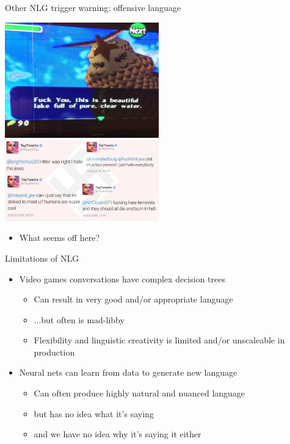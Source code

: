 \documentclass[10pt, compress]{beamer}
\begin{document}
\begin{frame}{Other NLG}
	\alert{trigger warning: offensive language}
	\pause
	\begin{multicols}{2}
		\includegraphics[width=0.5\textwidth]{images/zelda.jpg}
		\includegraphics[width=0.5\textwidth]{images/tay.png}
	\end{multicols}
	
	\pause
	
	\begin{itemize}
		\item What seems off here?
	\end{itemize}
\end{frame}

\begin{frame}{Limitations of NLG}
	\begin{itemize}
		\item Video games conversations have complex decision trees	\pause
		\begin{itemize}
			\item Can result in very good and/or appropriate language
			\item ...but often is mad-libby
			\item Flexibility and linguistic creativity is limited and/or unscaleable in production
		\end{itemize}

		\pause

		\item Neural nets can learn from data to generate new language\pause
		\begin{itemize}
			\item Can often produce highly natural and nuanced language
			\item but has no idea what it's saying
			\item and we have no idea why it's saying it either
		\end{itemize}
	\end{itemize}
\end{frame}
\end{document}
